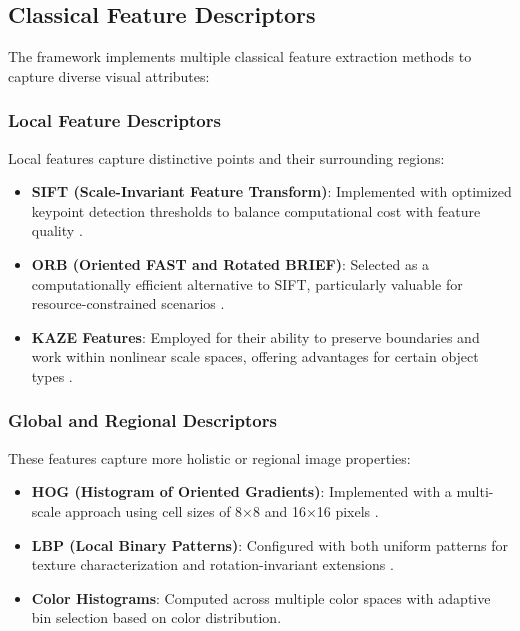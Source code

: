 \subsection{Classical Feature Descriptors}
The framework implements multiple classical feature extraction methods to capture diverse visual attributes:

\subsubsection{Local Feature Descriptors}
Local features capture distinctive points and their surrounding regions:

\begin{itemize}
    \item \textbf{SIFT (Scale-Invariant Feature Transform)}: Implemented with optimized keypoint detection thresholds to balance computational cost with feature quality \cite{lowe2004distinctive}.
    
    \item \textbf{ORB (Oriented FAST and Rotated BRIEF)}: Selected as a computationally efficient alternative to SIFT, particularly valuable for resource-constrained scenarios \cite{rublee2011orb}.
    
    \item \textbf{KAZE Features}: Employed for their ability to preserve boundaries and work within nonlinear scale spaces, offering advantages for certain object types \cite{alcantarilla2012kaze}.
\end{itemize}

\subsubsection{Global and Regional Descriptors}
These features capture more holistic or regional image properties:

\begin{itemize}
    \item \textbf{HOG (Histogram of Oriented Gradients)}: Implemented with a multi-scale approach using cell sizes of 8×8 and 16×16 pixels \cite{dalal2005histograms}.
    
    \item \textbf{LBP (Local Binary Patterns)}: Configured with both uniform patterns for texture characterization and rotation-invariant extensions \cite{ojala2002multiresolution}.
    
    \item \textbf{Color Histograms}: Computed across multiple color spaces with adaptive bin selection based on color distribution.
\end{itemize}

